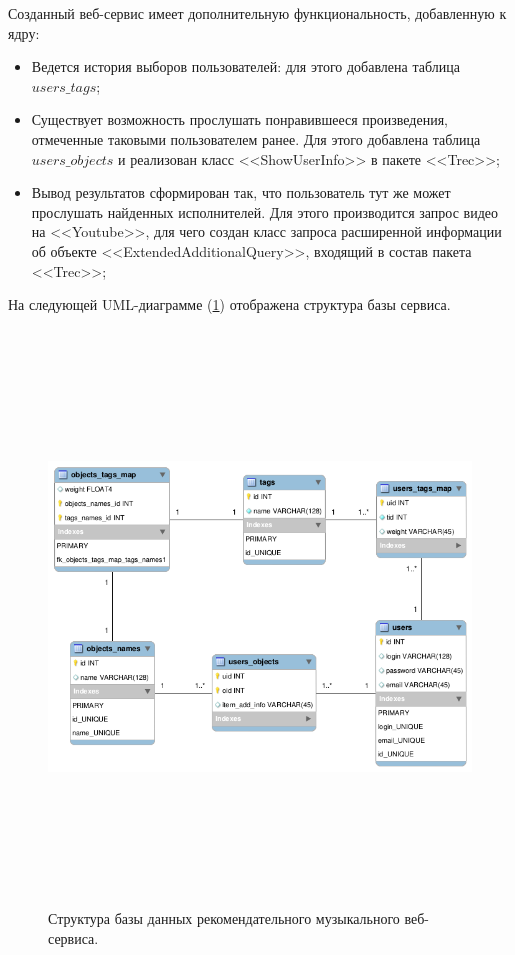 Созданный веб-сервис имеет дополнительную функциональность, добавленную к ядру:
\begin{itemize}
\item Ведется история выборов пользователей: для этого добавлена таблица $users\_tags$;
\item Существует возможность прослушать понравившееся произведения, отмеченные
	таковыми пользователем ранее. Для этого
добавлена таблица $users\_objects$ и реализован класс <<ShowUserInfo>> в пакете
		<<Trec>>;
\item Вывод результатов сформирован так, что пользователь тут же может
	прослушать найденных исполнителей.
Для этого производится запрос видео на <<Youtube>>, для чего создан класс запроса
		расширенной информации об объекте
<<ExtendedAdditionalQuery>>, входящий в состав пакета <<Trec>>;
\end{itemize}

На следующей UML-диаграмме (\ref{pic:db-lf}) отображена структура базы сервиса.

\begin{figure}
\caption{Структура базы данных рекомендательного музыкального веб-сервиса.}
\label{pic:db-lf}
\begin{center}
  \includegraphics[width=7in,height=6in]{pics/db-scheme-lastfm.png}
\end{center}
\end{figure}

